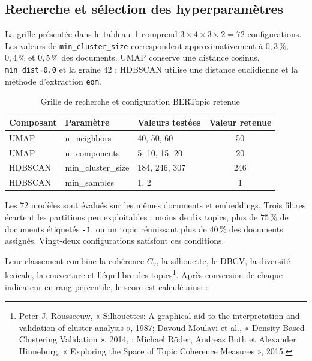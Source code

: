 \subsection{Recherche et sélection des hyperparamètres}

La grille présentée dans le tableau~\ref{tab:grille_bertopic} comprend \(3 \times 4 \times 3 \times 2=72\) configurations. Les valeurs de \texttt{min\_cluster\_size} correspondent approximativement à \(0{,}3\,\%\), \(0{,}4\,\%\) et \(0{,}5\,\%\) des documents. UMAP conserve une distance cosinus, \texttt{min\_dist=0.0} et la graine 42 ; HDBSCAN utilise une distance euclidienne et la méthode d'extraction \texttt{eom}.

\begin{table}[H]
    \centering
    \caption{Grille de recherche et configuration BERTopic retenue}
    \label{tab:grille_bertopic}
    \begin{tabularx}{\textwidth}{>{\ttfamily}l >{\ttfamily}l X c}
        \toprule
        \normalfont\textbf{Composant} & \normalfont\textbf{Paramètre}
        & \textbf{Valeurs testées} & \textbf{Valeur retenue} \\
        \midrule
        UMAP & n\_neighbors & 40, 50, 60 & 50 \\
        UMAP & n\_components & 5, 10, 15, 20 & 20 \\
        HDBSCAN & min\_cluster\_size & 184, 246, 307 & 246 \\
        HDBSCAN & min\_samples & 1, 2 & 1 \\
        \bottomrule
    \end{tabularx}
\end{table}

Les 72 modèles sont évalués sur les mêmes documents et embeddings. Trois filtres écartent les partitions peu exploitables : moins de dix topics, plus de \(75\,\%\) de documents étiquetés \texttt{-1}, ou un topic réunissant plus de \(40\,\%\) des documents assignés. Vingt-deux configurations satisfont ces conditions.

Leur classement combine la cohérence \(C_v\), la silhouette, le DBCV, la diversité lexicale, la couverture et l'équilibre des topics\footnote{Peter J. Rousseeuw, « Silhouettes: A graphical aid to the interpretation and validation of cluster analysis », 1987; Davoud Moulavi et al., « Density-Based Clustering Validation », 2014,  ; Michael Röder, Andreas Both et Alexander Hinneburg, « Exploring the Space of Topic Coherence Measures », 2015.}. Après conversion de chaque indicateur en rang percentile, le score est calculé ainsi :

